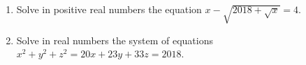 \begin{enumerate}
\item[(a)] Solve in positive real numbers the equation $x-\sqrt{2018+\sqrt x}=4$.
\item[(b)] Solve in real numbers the system of equations $x^2+y^2+z^2=20x+23y+33z=2018$.
\end{enumerate}
